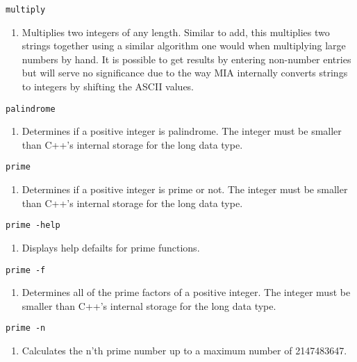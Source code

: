 \begin{lstlisting} 
multiply  
\end{lstlisting}
\begin{enumerate}
	\item[] Multiplies two integers of any length. Similar to add, this multiplies two strings together using a similar algorithm one would when multiplying large numbers by hand. It is possible to get results by entering non-number entries but will serve no significance due to the way MIA internally converts strings to integers by shifting the ASCII values.
\end{enumerate}

\begin{lstlisting} 
palindrome   
\end{lstlisting}
\begin{enumerate}
	\item[] Determines if a positive integer is palindrome. The integer must be smaller than C++'s internal storage for the long data type.
\end{enumerate}

\begin{lstlisting} 
prime   
\end{lstlisting}
\begin{enumerate}
	\item[] Determines if a positive integer is prime or not. The integer must be smaller than C++'s internal storage for the long data type.
\end{enumerate}

\begin{lstlisting} 
prime -help
\end{lstlisting}
\begin{enumerate}
	\item[]  Displays help defailts for prime functions.
\end{enumerate}

\begin{lstlisting} 
prime -f   
\end{lstlisting}
\begin{enumerate}
	\item[] Determines all of the prime factors of a positive integer. The integer must be smaller than C++'s internal storage for the long data type.
\end{enumerate}

\begin{lstlisting} 
prime -n  
\end{lstlisting}
\begin{enumerate}
	\item[] Calculates the n'th prime number up to a maximum number of 2147483647.
\end{enumerate}

